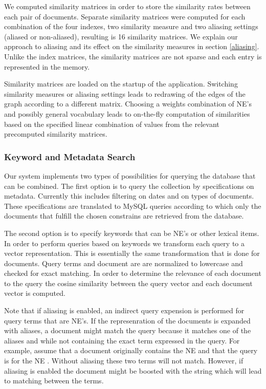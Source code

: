 We computed similarity matrices in order to store the similarity rates between each pair of documents. Separate similarity matrices were computed for each combination of the four indexes, two similarity measure and two aliasing settings (aliased or non-aliased), resulting is 16 similarity matrices. We explain our approach to aliasing and its effect on the similarity measures in section \ref{aliasing}. Unlike the index matrices, the similarity matrices are not sparse and each entry is represented in the memory.

Similarity matrices are loaded on the startup of the application. Switching similarity measures or aliasing settings leads to redrawing of the edges of the graph according to a different matrix. Choosing a weights combination of NE's and possibly general vocabulary leads to on-the-fly computation of similarities based on the specified linear combination of values from the relevant precomputed similarity matrices.

   
\subsubsection{Keyword and Metadata Search}\label{sec:keyword_search}

Our system implements two types of possibilities for querying the database that can be combined. The first option is to query the collection by specifications on metadata. Currently this includes filtering on dates and on types of documents. These specifications are translated to MySQL queries according to which only the documents that fulfill the chosen constrains are retrieved from the database. 

The second option is to specify keywords that can be NE's or other lexical items. In order to perform queries based on keywords we transform each query to a vector representation. This is essentially the same transformation that is done for documents. Query terms and document are are normalized to lowercase and checked for exact matching. In order to determine the relevance of each document to the query the cosine similarity between the query vector and each document vector is computed. 

Note that if aliasing is enabled, an indirect query expension is performed for query terms that are NE's. If the represenration of the documents is expanded with aliases, a document might match the query because it matches one of the aliases and while not containing the exact term expressed in the query. For example, assume that a document originally contains the NE  and that the query is for the NE . Without aliasing these two terms will not match. However, if aliasing is enabled the document might be boosted with the string  which will lead to matching between the terms. 

